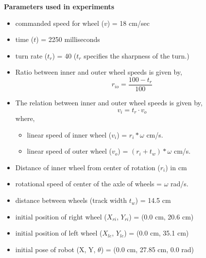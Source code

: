 \textbf{Parameters used in experiments}
\begin{itemize}
	\item commanded speed for wheel ($v$) = 18 cm/sec
	\item time ($t$) = 2250 milliseconds
	\item turn rate ($t_r$) = 40 ($t_r$ specifies the sharpness of the turn.)
	\item Ratio between inner and outer wheel speeds is given by,
	\begin{equation}
	r_{io} = \frac{100 - t_r}{100}
	\end{equation}
	\item The relation between inner and outer wheel speeds is given by,
	\begin{equation}
	v_i = t_r \cdot v_o
	\end{equation}
	where,
	\begin{itemize}
	\item linear speed of inner wheel ($v_i$) = $r_i * \omega$ cm/s.
	\item linear speed of outer wheel ($v_o$) = $(r_i + t_w ) * \omega$ cm/s.
	\end{itemize}
	\item Distance of inner wheel from center of rotation ($r_i$) in cm 
	\item rotational speed of center of the axle of wheels = $\omega$ rad/s.
	\item distance between wheels (track width $t_w$) = 14.5 cm 
	\item initial position of right wheel ($X_{ri}$, $Y_{ri}$) = (0.0 cm, 20.6 cm) 
	\item initial position of left wheel ($X_{le}$, $Y_{le}$) = (0.0 cm, 35.1 cm)
	\item initial pose of robot (X, Y, $\theta$) = (0.0 cm, 27.85 cm, 0.0 rad)
\end{itemize}

